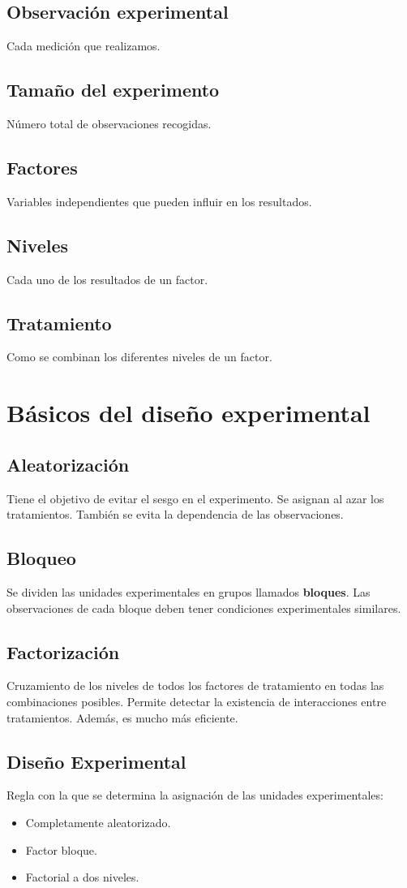 \documentclass{article}
\begin{document}
\subsection{Observación experimental}
Cada medición que realizamos.
\subsection{Tamaño del experimento}
Número total de observaciones recogidas.
\subsection{Factores}
Variables independientes que pueden influir en los resultados.
\subsection{Niveles}
Cada uno de los resultados de un factor.
\subsection{Tratamiento}
Como se combinan los diferentes niveles de un factor.
\section{Básicos del diseño experimental}
\subsection{Aleatorización}
Tiene el objetivo de evitar el sesgo en el experimento. Se asignan al azar los tratamientos.
También se evita la dependencia de las observaciones.
\subsection{Bloqueo}
Se dividen las unidades experimentales en grupos llamados \textbf{bloques}. Las
observaciones de cada bloque deben tener condiciones experimentales similares.
\subsection{Factorización}
Cruzamiento de los niveles de todos los factores de tratamiento en todas las
combinaciones posibles. Permite detectar la existencia de interacciones entre
tratamientos. Además, es mucho más eficiente.
\subsection{Diseño Experimental}
Regla con la que se determina la asignación de las unidades experimentales:
\begin{itemize}
	\item Completamente aleatorizado.
	\item Factor bloque.
	\item Factorial a dos niveles.
\end{itemize}
\end{document}
